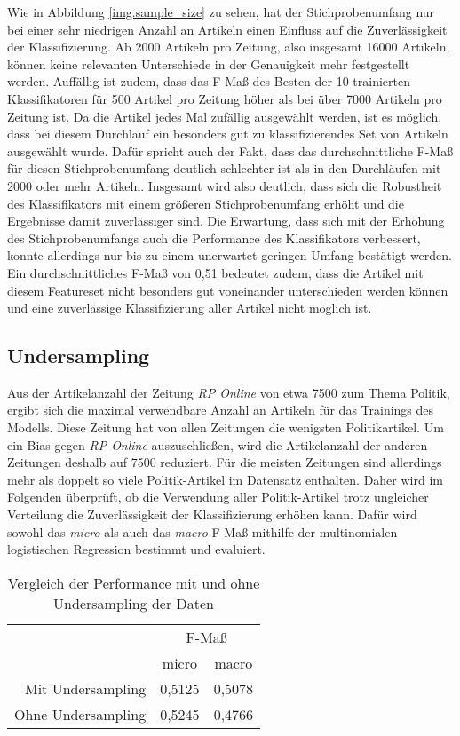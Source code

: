 Wie in Abbildung \ref{img.sample_size} zu sehen, hat der Stichprobenumfang nur bei einer sehr niedrigen Anzahl an Artikeln einen Einfluss auf die Zuverlässigkeit der Klassifizierung. Ab 2000 Artikeln pro Zeitung, also insgesamt 16000 Artikeln, können keine relevanten Unterschiede in der Genauigkeit mehr festgestellt werden. Auffällig ist zudem, dass das F-Maß des Besten der 10 trainierten Klassifikatoren für 500 Artikel pro Zeitung höher als bei über 7000 Artikeln pro Zeitung ist. Da die Artikel jedes Mal zufällig ausgewählt werden, ist es möglich, dass bei diesem Durchlauf ein besonders gut zu klassifizierendes Set von Artikeln ausgewählt wurde. Dafür spricht auch der Fakt, dass das durchschnittliche F-Maß für diesen Stichprobenumfang deutlich schlechter ist als in den Durchläufen mit 2000 oder mehr Artikeln. Insgesamt wird also deutlich, dass sich die Robustheit des Klassifikators mit einem größeren Stichprobenumfang erhöht und die Ergebnisse damit zuverlässiger sind. Die Erwartung, dass sich mit der Erhöhung des Stichprobenumfangs auch die Performance des Klassifikators verbessert, konnte allerdings nur bis zu einem unerwartet geringen Umfang bestätigt werden. Ein durchschnittliches F-Maß von 0,51 bedeutet zudem, dass die Artikel mit diesem Featureset nicht besonders gut voneinander unterschieden werden können und eine zuverlässige Klassifizierung aller Artikel nicht möglich ist.

\subsection{Undersampling}
Aus der Artikelanzahl der Zeitung \emph{RP Online} von etwa 7500 zum Thema Politik, ergibt sich die maximal verwendbare Anzahl an Artikeln für das Trainings des Modells. Diese Zeitung hat von allen Zeitungen die wenigsten Politikartikel. Um ein Bias gegen \emph{RP Online} auszuschließen, wird die Artikelanzahl der anderen Zeitungen deshalb auf 7500 reduziert. Für die meisten Zeitungen sind allerdings mehr als doppelt so viele Politik-Artikel im Datensatz enthalten. Daher wird im Folgenden überprüft, ob die Verwendung aller Politik-Artikel trotz ungleicher Verteilung die Zuverlässigkeit der Klassifizierung erhöhen kann. Dafür wird sowohl das \textit{micro} als auch das \textit{macro} F-Maß mithilfe der multinomialen logistischen Regression bestimmt und evaluiert.

\begin{table}[h]
\centering
\begin{spacing}{1.25}
\begin{tabular}[t]{rcc}
\toprule
~ & \multicolumn{2}{c}{F-Maß}\\
~ & micro & macro\\
Mit Undersampling & 0,5125 & 0,5078\\
Ohne Undersampling & 0,5245 & 0,4766\\
\bottomrule
\end{tabular}
\caption{Vergleich der Performance mit und ohne Undersampling der Daten}
\label{table.undersampling}
\end{spacing}
\end{table}

